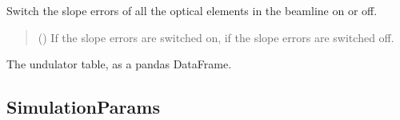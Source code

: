 \documentclass[letterpaper,10pt,english]{sphinxmanual}
\begin{document}
\begin{fulllineitems}

\begin{fulllineitems}
\label{\detokenize{API:raypyng.simulate.Simulate.slope_errors}}
\pysigstartsignatures
\pysiglinewithargsret
{}
{}
{}
\pysigstopsignatures
\sphinxAtStartPar
Switch the slope errors of all the optical elements in the beamline on or off.
\begin{quote}\begin{description}
\sphinxAtStartPar
{} (\sphinxstyleliteralemphasis{\sphinxupquote{, }}) \textendash{} If  the slope errors are switched on,
if  the slope errors are switched off.

\end{description}\end{quote}

\end{fulllineitems}


\begin{fulllineitems}
\label{\detokenize{API:raypyng.simulate.Simulate.undulator_table}}
\pysigstartsignatures
\pysigline
{}
\pysigstopsignatures
\sphinxAtStartPar
The undulator table, as a pandas DataFrame.

\end{fulllineitems}


\end{fulllineitems}



\subsection{SimulationParams}
\label{\detokenize{API:simulationparams}}
\end{document}
